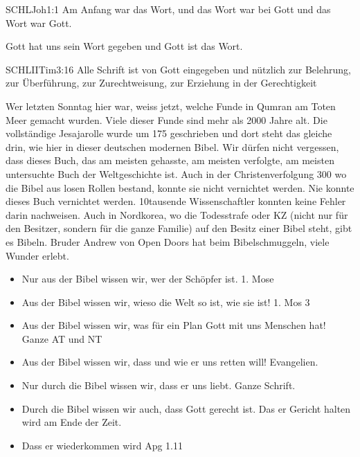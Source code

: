 \begin{otsblock}
\begin{otsblock}
        \end{otsblock}
        \begin{otsblock}
        \begin{bibelbox}{SCHL}{Joh}{1:1}
        Am Anfang war das Wort, und das Wort war bei Gott und das Wort war Gott.
        \end{bibelbox}
        Gott hat uns sein Wort gegeben und Gott ist das Wort. 
        \begin{bibelbox}{SCHL}{IITim}{3:16}
        Alle Schrift ist von Gott eingegeben und nützlich zur Belehrung, zur Überführung, zur Zurechtweisung, zur Erziehung in der Gerechtigkeit
        \end{bibelbox}
        Wer letzten Sonntag hier war, weiss jetzt, welche Funde in Qumran am Toten Meer gemacht wurden. Viele dieser Funde sind mehr als 2000 Jahre alt. Die vollständige Jesajarolle \zB{} wurde um 175 \vChr{} geschrieben und dort steht das gleiche drin, wie hier in dieser deutschen modernen Bibel. Wir dürfen nicht vergessen, dass dieses Buch, das am meisten gehasste, am meisten verfolgte, am meisten untersuchte Buch der Weltgeschichte ist. Auch in der Christenverfolgung 300 \nChr{} wo die Bibel aus losen Rollen bestand, konnte sie nicht vernichtet werden. Nie konnte dieses Buch vernichtet werden. 10tausende Wissenschaftler konnten keine Fehler darin nachweisen. Auch in Nordkorea, wo die Todesstrafe oder KZ (nicht nur für den Besitzer, sondern für die ganze Familie) auf den Besitz einer Bibel steht, gibt es Bibeln. Bruder Andrew von Open Doors hat beim Bibelschmuggeln, viele Wunder erlebt.    
        \begin{itemize}
            \item Nur aus der Bibel wissen wir, wer der Schöpfer ist. 1. Mose
            \item Aus der Bibel wissen wir, wieso die Welt so ist, wie sie ist! 1. Mos 3
            \item Aus der Bibel wissen wir, was für ein Plan Gott mit uns Menschen hat! Ganze AT und NT
            \item Aus der Bibel wissen wir, dass und wie er uns retten will! Evangelien.
            \item Nur durch die Bibel wissen wir, dass er uns liebt. Ganze Schrift.
            \item Durch die Bibel wissen wir auch, dass Gott gerecht ist. Das er Gericht halten wird am Ende der Zeit.
            \item Dass er wiederkommen wird Apg 1.11

\end{itemize}
\end{otsblock}
\end{otsblock}
